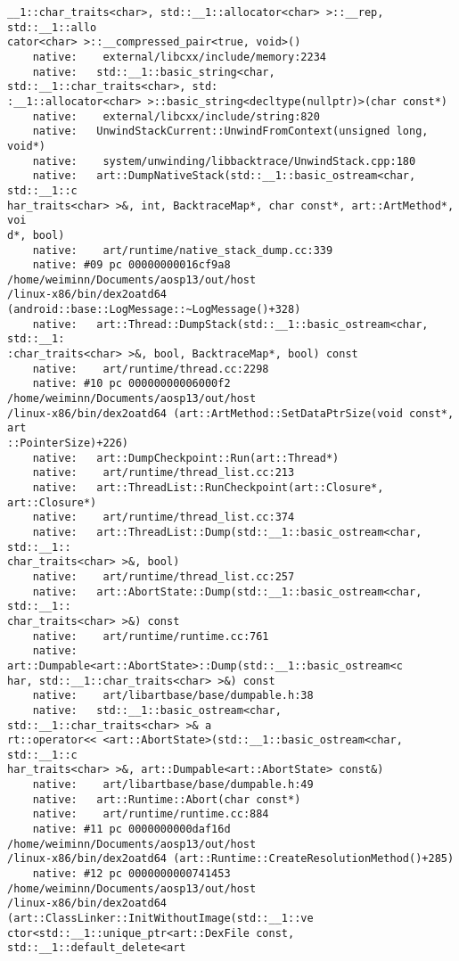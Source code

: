 \begin{lstlisting}
__1::char_traits<char>, std::__1::allocator<char> >::__rep, std::__1::allo
cator<char> >::__compressed_pair<true, void>()
    native:    external/libcxx/include/memory:2234
    native:   std::__1::basic_string<char, std::__1::char_traits<char>, std:
:__1::allocator<char> >::basic_string<decltype(nullptr)>(char const*)
    native:    external/libcxx/include/string:820
    native:   UnwindStackCurrent::UnwindFromContext(unsigned long, void*)
    native:    system/unwinding/libbacktrace/UnwindStack.cpp:180
    native:   art::DumpNativeStack(std::__1::basic_ostream<char, std::__1::c
har_traits<char> >&, int, BacktraceMap*, char const*, art::ArtMethod*, voi
d*, bool)
    native:    art/runtime/native_stack_dump.cc:339
    native: #09 pc 00000000016cf9a8  /home/weiminn/Documents/aosp13/out/host
/linux-x86/bin/dex2oatd64 (android::base::LogMessage::~LogMessage()+328)
    native:   art::Thread::DumpStack(std::__1::basic_ostream<char, std::__1:
:char_traits<char> >&, bool, BacktraceMap*, bool) const
    native:    art/runtime/thread.cc:2298
    native: #10 pc 00000000006000f2  /home/weiminn/Documents/aosp13/out/host
/linux-x86/bin/dex2oatd64 (art::ArtMethod::SetDataPtrSize(void const*, art
::PointerSize)+226)
    native:   art::DumpCheckpoint::Run(art::Thread*)
    native:    art/runtime/thread_list.cc:213
    native:   art::ThreadList::RunCheckpoint(art::Closure*, art::Closure*)
    native:    art/runtime/thread_list.cc:374
    native:   art::ThreadList::Dump(std::__1::basic_ostream<char, std::__1::
char_traits<char> >&, bool)
    native:    art/runtime/thread_list.cc:257
    native:   art::AbortState::Dump(std::__1::basic_ostream<char, std::__1::
char_traits<char> >&) const
    native:    art/runtime/runtime.cc:761
    native:   art::Dumpable<art::AbortState>::Dump(std::__1::basic_ostream<c
har, std::__1::char_traits<char> >&) const
    native:    art/libartbase/base/dumpable.h:38
    native:   std::__1::basic_ostream<char, std::__1::char_traits<char> >& a
rt::operator<< <art::AbortState>(std::__1::basic_ostream<char, std::__1::c
har_traits<char> >&, art::Dumpable<art::AbortState> const&)
    native:    art/libartbase/base/dumpable.h:49
    native:   art::Runtime::Abort(char const*)
    native:    art/runtime/runtime.cc:884
    native: #11 pc 0000000000daf16d  /home/weiminn/Documents/aosp13/out/host
/linux-x86/bin/dex2oatd64 (art::Runtime::CreateResolutionMethod()+285)
    native: #12 pc 0000000000741453  /home/weiminn/Documents/aosp13/out/host
/linux-x86/bin/dex2oatd64 (art::ClassLinker::InitWithoutImage(std::__1::ve
ctor<std::__1::unique_ptr<art::DexFile const, std::__1::default_delete<art

\end{lstlisting}
